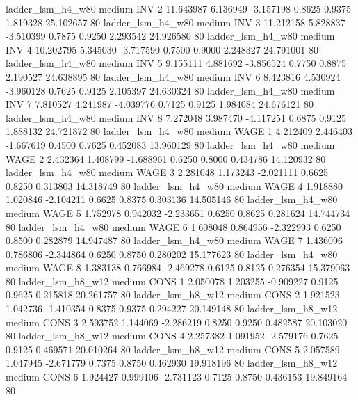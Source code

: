      ladder_lsm_h4_w80     medium      INV                 2 11.643987 6.136949 -3.157198 0.8625 0.9375  1.819328   25.102657 80
     ladder_lsm_h4_w80     medium      INV                 3 11.212158 5.828837 -3.510399 0.7875 0.9250  2.293542   24.926580 80
     ladder_lsm_h4_w80     medium      INV                 4 10.202795 5.345030 -3.717590 0.7500 0.9000  2.248327   24.791001 80
     ladder_lsm_h4_w80     medium      INV                 5  9.155111 4.881692 -3.856524 0.7750 0.8875  2.190527   24.638895 80
     ladder_lsm_h4_w80     medium      INV                 6  8.423816 4.530924 -3.960128 0.7625 0.9125  2.105397   24.630324 80
     ladder_lsm_h4_w80     medium      INV                 7  7.810527 4.241987 -4.039776 0.7125 0.9125  1.984084   24.676121 80
     ladder_lsm_h4_w80     medium      INV                 8  7.272048 3.987470 -4.117251 0.6875 0.9125  1.888132   24.721872 80
     ladder_lsm_h4_w80     medium     WAGE                 1  4.212409 2.446403 -1.667619 0.4500 0.7625  0.452083   13.960129 80
     ladder_lsm_h4_w80     medium     WAGE                 2  2.432364 1.408799 -1.688961 0.6250 0.8000  0.434786   14.120932 80
     ladder_lsm_h4_w80     medium     WAGE                 3  2.281048 1.173243 -2.021111 0.6625 0.8250  0.313803   14.318749 80
     ladder_lsm_h4_w80     medium     WAGE                 4  1.918880 1.020846 -2.104211 0.6625 0.8375  0.303136   14.505146 80
     ladder_lsm_h4_w80     medium     WAGE                 5  1.752978 0.942032 -2.233651 0.6250 0.8625  0.281624   14.744734 80
     ladder_lsm_h4_w80     medium     WAGE                 6  1.608048 0.864956 -2.322993 0.6250 0.8500  0.282879   14.947487 80
     ladder_lsm_h4_w80     medium     WAGE                 7  1.436096 0.786806 -2.344864 0.6250 0.8750  0.280202   15.177623 80
     ladder_lsm_h4_w80     medium     WAGE                 8  1.383138 0.766984 -2.469278 0.6125 0.8125  0.276354   15.379063 80
     ladder_lsm_h8_w12     medium     CONS                 1  2.050078 1.203255 -0.909227 0.9125 0.9625  0.215818   20.261757 80
     ladder_lsm_h8_w12     medium     CONS                 2  1.921523 1.042736 -1.410354 0.8375 0.9375  0.294227   20.149148 80
     ladder_lsm_h8_w12     medium     CONS                 3  2.593752 1.144069 -2.286219 0.8250 0.9250  0.482587   20.103020 80
     ladder_lsm_h8_w12     medium     CONS                 4  2.257382 1.091952 -2.579176 0.7625 0.9125  0.469571   20.010264 80
     ladder_lsm_h8_w12     medium     CONS                 5  2.057589 1.047945 -2.671779 0.7375 0.8750  0.462930   19.918196 80
     ladder_lsm_h8_w12     medium     CONS                 6  1.924427 0.999106 -2.731123 0.7125 0.8750  0.436153   19.849164 80
